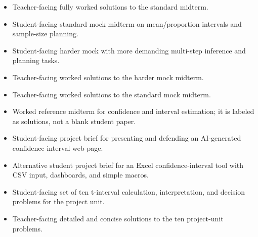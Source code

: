 \begin{itemize}
  Student-facing midterm covering sample statistics, parameters, confidence intervals, interpretation, and sample size.

  \item {}

  Teacher-facing fully worked solutions to the standard midterm.

  \item {}

  Student-facing standard mock midterm on mean/proportion intervals and sample-size planning.

  \item {}

  Student-facing harder mock with more demanding multi-step inference and planning tasks.

  \item {}

  Teacher-facing worked solutions to the harder mock midterm.

  \item {}

  Teacher-facing worked solutions to the standard mock midterm.

  \item {}

  Worked reference midterm for confidence and interval estimation; it is labeled as solutions, not a blank student paper.

  \item {}

  Student-facing project brief for presenting and defending an AI-generated confidence-interval web page.

  \item {}

  Alternative student project brief for an Excel confidence-interval tool with CSV input, dashboards, and simple macros.

  \item {}

  Student-facing set of ten t-interval calculation, interpretation, and decision problems for the project unit.

  \item {}

  Teacher-facing detailed and concise solutions to the ten project-unit problems.
\end{itemize}

